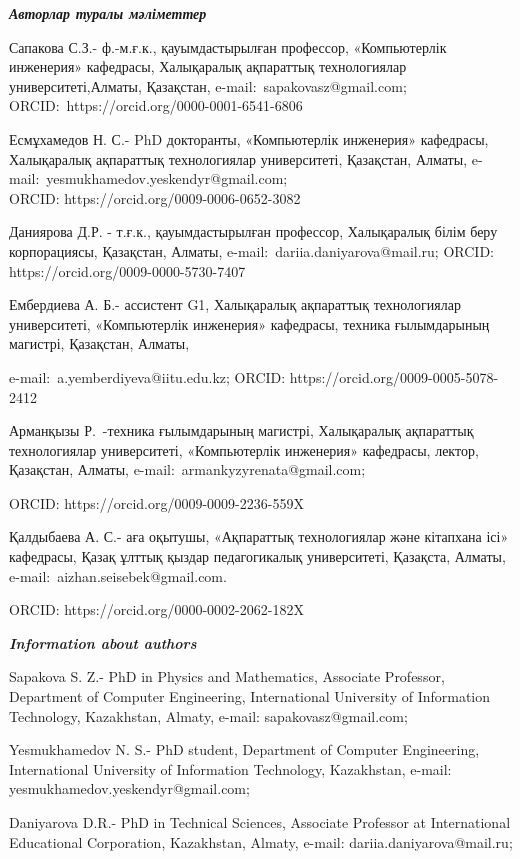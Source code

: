 \begin{authorinfo}
\emph{{\bfseries Авторлар туралы мәліметтер}}

Сапакова С.З.- ф.-м.ғ.к., қауымдастырылған профессор, «Компьютерлік
инженерия» кафедрасы, Халықаралық ақпараттық технологиялар
университеті,Алматы, Қазақстан, e-mail:~sapakovasz@gmail.com;
ORCID:~https://orcid.org/0000-0001-6541-6806

Есмұхамедов Н. С.- PhD докторанты, «Компьютерлік инженерия» кафедрасы,
Халықаралық ақпараттық технологиялар университеті, Қазақстан, Алматы,
e-mail:~yesmukhamedov.yeskendyr@gmail.com;\\
ORCID: https://orcid.org/0009-0006-0652-3082

Даниярова Д.Р. - т.ғ.к., қауымдастырылған профессор, Халықаралық білім
беру корпорациясы, Қазақстан, Алматы, e-mail:~dariia.daniyarova@mail.ru;
ORCID: https://orcid.org/0009-0000-5730-7407

Ембердиева А. Б.- ассистент G1, Халықаралық ақпараттық технологиялар
университеті, «Компьютерлік инженерия» кафедрасы, техника ғылымдарының
магистрі, Қазақстан, Алматы,

e-mail:~a.yemberdiyeva@iitu.edu.kz; ORCID:
https://orcid.org/0009-0005-5078-2412

Арманқызы Р.~-техника ғылымдарының магистрі, Халықаралық ақпараттық
технологиялар университеті, «Компьютерлік инженерия» кафедрасы, лектор,
Қазақстан, Алматы, e-mail:~armankyzyrenata@gmail.com;

ORCID: https://orcid.org/0009-0009-2236-559X

Қалдыбаева А. С.- аға оқытушы, «Ақпараттық технологиялар және кітапхана
ісі» кафедрасы, Қазақ ұлттық қыздар педагогикалық университеті,
Қазақста, Алматы, e-mail:~aizhan.seisebek@gmail.com.

ORCID: https://orcid.org/0000-0002-2062-182X

\emph{{\bfseries Information about authors}}

Sapakova S. Z.- PhD in Physics and Mathematics, Associate Professor,
Department of Computer Engineering, International University of
Information Technology, Kazakhstan, Almaty, e-mail:
sapakovasz@gmail.com;

Yesmukhamedov N. S.- PhD student, Department of Computer Engineering,
International University of Information Technology, Kazakhstan, e-mail:
yesmukhamedov.yeskendyr@gmail.com;

Daniyarova D.R.- PhD in Technical Sciences, Associate Professor at
International Educational Corporation, Kazakhstan, Almaty, e-mail:
dariia.daniyarova@mail.ru;


\end{authorinfo}
